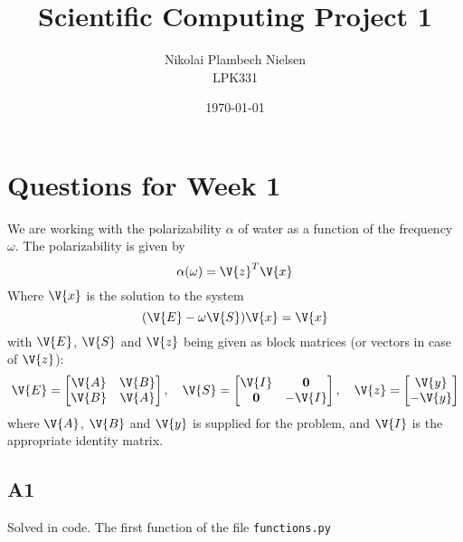 \documentclass[a4paper,10pt]{article}
\title{Scientific Computing Project 1}
\author{Nikolai Plambech Nielsen\\LPK331}
\date{\today}
\begin{document}
	\maketitle
	\section{Questions for Week 1}
	We are working with the polarizability $ \alpha $ of water as a function of the frequency $ \omega $. The polarizability is given by
	\begin{equation}\label{key}
		\alpha(\omega) = \V{z}^T \V{x}
	\end{equation}
	Where $ \V{x} $ is the solution to the system
	\begin{equation}\label{key}
		(\V{E}-\omega\V{S})\V{x} =\V{x}
	\end{equation}
	with $\V{E}$, $ \V{S} $ and $ \V{z} $ being given as block matrices (or vectors in case of $ \V{z} $):
	\begin{equation}\label{key}
		\V{E} = \begin{bmatrix}
		\V{A} & \V{B} \\ \V{B} & \V{A}
		\end{bmatrix}, \quad \V{S} = \begin{bmatrix}
		\V{I} & \mathbf{0} \\ \mathbf{0} & -\V{I}
		\end{bmatrix}, \quad \V{z} = \begin{bmatrix}
		\V{y} \\ -\V{y}
		\end{bmatrix}
	\end{equation}
	where $ \V{A} $, $ \V{B} $ and $ \V{y} $ is supplied for the problem, and $ \V{I} $ is the appropriate identity matrix.
	
	\subsection*{A1}
	Solved in code. The first function of the file \texttt{functions.py}
	
\end{document}
